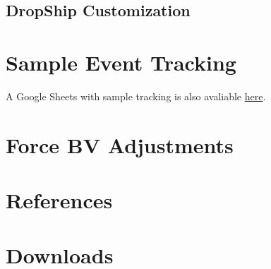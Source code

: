 \documentclass{article}
\newcommand{\mysectiontitle}{}
\newcommand{\newsection}[2]{\renewcommand{\mysectiontitle}{#2}\section{#1}}
\begin{document}


\subsection{DropShip Customization}



\newpage

\newsection{Sample Event Tracking}{sample-tracking-event}
\label{sec:sample_tracking_event}

A Google Sheets with sample tracking is also avaliable \href{https://docs.google.com/spreadsheets/d/17bFS4qAbdIUJQ173NxxHDCCGLD_BG0LDdHGekpoF5M0}{here}.



\newpage

\newsection{Force BV Adjustments}{bv-adjustments}
\label{sec:force_bv_adjustments}



\newpage

\newsection{References}{references}
\label{sec:references}



\newpage

\newsection{Downloads}{downloads}
\label{sec:downloads}



\newpage
\end{document}
